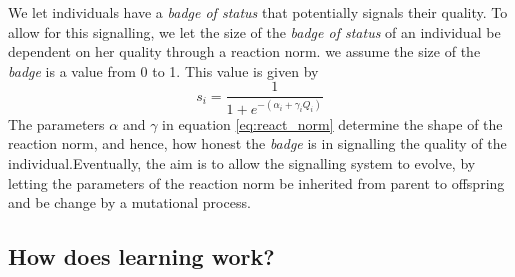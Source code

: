 \documentclass[
]{article}
\begin{document}
We let individuals have a \emph{badge of status} that potentially
signals their quality. To allow for this signalling, we let the size of
the \emph{badge of status} of an individual be dependent on her quality
through a reaction norm. we assume the size of the \emph{badge} is a
value from 0 to 1. This value is given by \begin{equation}
s_i = \frac{1}{1+e^{-(\alpha_i+\gamma_iQ_i)}}
\label{eq:react_norm}
\end{equation} The parameters \(\alpha\) and \(\gamma\) in equation
\ref{eq:react_norm} determine the shape of the reaction norm, and hence,
how honest the \emph{badge} is in signalling the quality of the
individual.Eventually, the aim is to allow the signalling system to
evolve, by letting the parameters of the reaction norm be inherited from
parent to offspring and be change by a mutational process.

\hypertarget{how-does-learning-work}{%
\subsection{How does learning work?}\label{how-does-learning-work}}
\end{document}
